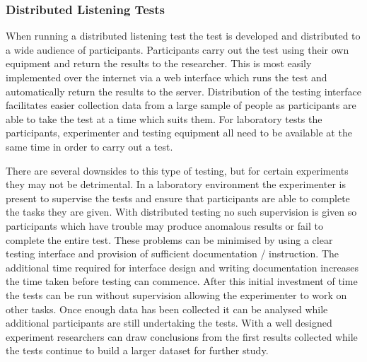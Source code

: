 		\subsubsection*{Distributed Listening Tests}
			When running a distributed listening test the test is developed and distributed to a wide audience
			of participants. Participants carry out the test using their own equipment and return the results
			to the researcher. This is most easily implemented over the internet via a web interface which runs
			the test and automatically return the results to the server. Distribution of the testing interface
			facilitates easier collection data from a large sample of people as participants are able to take
			the test at a time which suits them. For laboratory tests the participants, experimenter and
			testing equipment all need to be available at the same time in order to carry out a test.

			There are several downsides to this type of testing, but for certain experiments they may not be
			detrimental. In a laboratory environment the experimenter is present to supervise the tests and
			ensure that participants are able to complete the tasks they are given.  With distributed testing
			no such supervision is given so participants which have trouble may produce anomalous results or
			fail to complete the entire test. These problems can be minimised by using a clear testing
			interface and provision of sufficient documentation / instruction. The additional time required for
			interface design and writing documentation increases the time taken before testing can commence.
			After this initial investment of time the tests can be run without supervision allowing the
			experimenter to work on other tasks. Once enough data has been collected it can be analysed while
			additional participants are still undertaking the tests. With a well designed experiment
			researchers can draw conclusions from the first results collected while the tests continue to build
			a larger dataset for further study.

